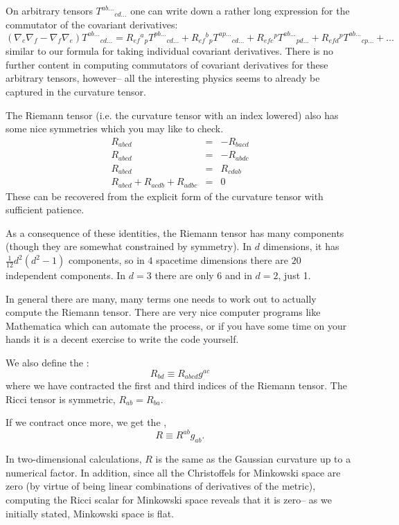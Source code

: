 On arbitrary tensors $T^{ab\ldots}{}_{cd\ldots}$ one can write down a rather long expression for the commutator of the covariant derivatives:
$$(\nabla_e \nabla_f -\nabla_f \nabla_e)T^{ab\ldots}{}_{cd\ldots} = {R_{ef}}{}^a{}_p T^{pb \ldots}{}_{cd \ldots}+{R_{ef}{}^b}{}_p T^{ap\ldots}{}_{cd \ldots}+ R_{efc}{}^p T^{ab\ldots}{}_{pd\ldots} + R_{efd}{}^p T^{ab\ldots}{}_{cp\ldots} + \ldots$$
similar to our formula for taking individual covariant derivatives. There is no further content in computing commutators of covariant derivatives for these arbitrary tensors, however-- all the interesting physics seems to already be captured in the curvature tensor.

The Riemann tensor (i.e. the curvature tensor with an index lowered) also has some nice symmetries which you may like to check.
\begin{eqnarray*}
R_{abcd}&=& -R_{bacd}\\
R_{abcd}&=& -R_{abdc}\\
R_{abcd}&=&R_{cdab}\\
R_{abcd}+R_{acdb}+R_{adbc}&=&0
\end{eqnarray*}
These can be recovered from the explicit form of the curvature tensor with sufficient patience.

As a consequence of these identities, the Riemann tensor has many components (though they are somewhat constrained by symmetry). In $d$ dimensions, it has
$\frac{1}{12} d^2(d^2-1)$ components, so in $4$ spacetime dimensions there are $20$ independent components. In $d=3$ there are only $6$ and in $d=2$, just 1.

In general there are many, many terms one needs to work out to actually compute the Riemann tensor. There are very nice computer programs like Mathematica which can automate the process, or if you have some time on your hands it is a decent exercise to write the code yourself.

\begin{defn}
We also define the :
$$R_{bd}\equiv R_{abcd}g^{ac}$$
where we have contracted the first and third indices of the Riemann tensor. The Ricci tensor is symmetric, $R_{ab}=R_{ba}$.
\end{defn}
\begin{defn}
If we contract once more, we get the ,
$$R\equiv R^{ab}g_{ab}.$$
\end{defn}

In two-dimensional calculations, $R$ is the same as the Gaussian curvature up to a numerical factor. 
In addition, since all the Christoffels for Minkowski space are zero (by virtue of being linear combinations of derivatives of the metric), computing the Ricci scalar for Minkowski space reveals that it is zero-- as we initially stated, Minkowski space is flat.

